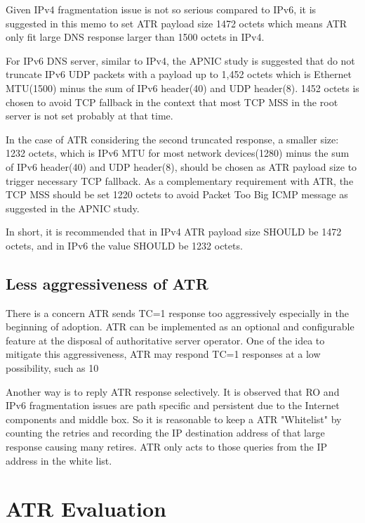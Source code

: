    Given IPv4 fragmentation issue is not so serious compared to IPv6, it
   is suggested in this memo to set ATR payload size 1472 octets which
   means ATR only fit large DNS response larger than 1500 octets in
   IPv4.

   For IPv6 DNS server, similar to IPv4, the APNIC study is suggested
   that do not truncate IPv6 UDP packets with a payload up to 1,452
   octets which is Ethernet MTU(1500) minus the sum of IPv6 header(40)
   and UDP header(8). 1452 octets is chosen to avoid TCP fallback in the
   context that most TCP MSS in the root server is not set probably at
   that time.

   In the case of ATR considering the second truncated response, a
   smaller size: 1232 octets, which is IPv6 MTU for most network
   devices(1280) minus the sum of IPv6 header(40) and UDP header(8),
   should be chosen as ATR payload size to trigger necessary TCP
   fallback.  As a complementary requirement with ATR, the TCP MSS
   should be set 1220 octets to avoid Packet Too Big ICMP message as
   suggested in the APNIC study.

   In short, it is recommended that in IPv4 ATR payload size SHOULD be
   1472 octets, and in IPv6 the value SHOULD be 1232 octets.

   \subsection{Less aggressiveness of ATR}

   There is a concern ATR sends TC=1 response too aggressively
   especially in the beginning of adoption.  ATR can be implemented as
   an optional and configurable feature at the disposal of authoritative
   server operator.  One of the idea to mitigate this aggressiveness,
   ATR may respond TC=1 responses at a low possibility, such as 10%

   Another way is to reply ATR response selectively.  It is observed
   that RO and IPv6 fragmentation issues are path specific and
   persistent due to the Internet components and middle box.  So it is
   reasonable to keep a ATR "Whitelist" by counting the retries and
   recording the IP destination address of that large response causing
   many retires.  ATR only acts to those queries from the IP address in
   the white list.
 
\section{ATR Evaluation}


